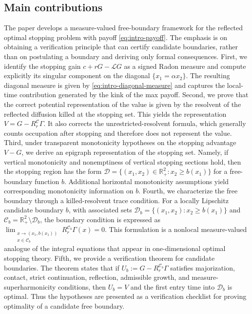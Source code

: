 \documentclass[pdflatex,sn-mathphys-num]{sn-jnl}
\theoremstyle{plain}
\theoremstyle{definition}
\theoremstyle{remark}
\numberwithin{equation}{section}
\begin{document}
\subsection{Main contributions} \label{subsec:intro-contributions} 

The paper develops a measure-valued free-boundary framework for the reflected optimal stopping problem with payoff \eqref{eq:intro-payoff}. The emphasis is on obtaining a verification principle that can certify candidate boundaries, rather than on postulating a boundary and deriving only formal consequences. 
First, we identify the stopping gain \(c+rG-\mathcal LG\) as a signed Radon measure and compute explicitly its singular component on the diagonal \(\{x_1=\alpha x_2\}\). The resulting diagonal measure is given by \eqref{eq:intro-diagonal-measure} and captures the local-time contribution generated by the kink of the max payoff. Second, we prove that the correct potential representation of the value is given by the resolvent of the reflected diffusion killed at the stopping set. This yields the representation 
$\displaystyle V=G-R_r^{\mathcal C}\Gamma$. 
It also corrects the unrestricted-resolvent formula, which generally counts occupation after stopping and therefore does not represent the value. Third, under transparent monotonicity hypotheses on the stopping advantage \(V-G\), we derive an epigraph representation of the stopping set. Namely, if vertical monotonicity and nonemptiness of vertical stopping sections hold, then the stopping region has the form 
$\displaystyle \mathcal D=\{(x_1,x_2)\in\mathbb R_+^2:x_2\ge b(x_1)\}$ for a free-boundary function \(b\). Additional horizontal monotonicity assumptions yield corresponding monotonicity information on \(b\). Fourth, we characterize the free boundary through a killed-resolvent trace condition. For a locally Lipschitz candidate boundary \(b\), with associated sets $\displaystyle \mathcal D_b=\{(x_1,x_2):x_2\ge b(x_1)\}$ and $\displaystyle \mathcal C_b=\mathbb R_+^2\setminus\mathcal D_b$, the boundary condition is expressed as 
$\displaystyle \lim_{\substack{x\to (x_1,b(x_1))\\ x\in\mathcal C_b}} R_r^{\mathcal C_b}\Gamma(x)=0$. This formulation is a nonlocal measure-valued analogue of the integral equations that appear in one-dimensional optimal stopping theory. Fifth, we provide a verification theorem for candidate boundaries. The theorem states that if 
$\displaystyle U_b:=G-R_r^{\mathcal C_b}\Gamma$ satisfies majorization, contact, strict continuation, reflection, admissible growth, and measure-superharmonicity conditions, then \(U_b=V\) and the first entry time into \(\mathcal D_b\) is optimal. Thus the hypotheses are presented as a verification checklist for proving optimality of a candidate free boundary. 
\end{document}
